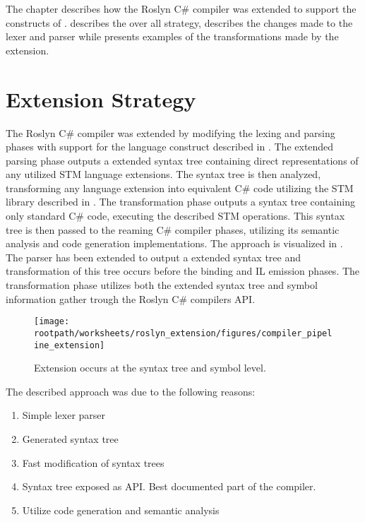 \makeatletter {}\makeatother
{}
The chapter describes how the Roslyn C\# compiler was extended to support the constructs of \stmname.  describes the over all strategy,  describes the changes made to the lexer and parser while  presents examples of the transformations made by the extension.
\label{chap:roslyn_extension}
\section{Extension Strategy}
\label{sec:roslyn_extension_strategy}
The Roslyn C\# compiler was extended by modifying the lexing and parsing phases with support for the language construct described in . The extended parsing phase outputs a extended syntax tree containing direct representations of any utilized \ac{STM} language extensions. The syntax tree is then analyzed, transforming any language extension into equivalent C\# code utilizing the \ac{STM} library described in . The transformation phase outputs a syntax tree containing only standard C\# code, executing the described \ac{STM} operations. This syntax tree is then passed to the reaming C\# compiler phases, utilizing its semantic analysis and code generation implementations. The approach is visualized in . The parser has been extended to output a extended syntax tree and transformation of this tree occurs before the binding and IL emission phases. The transformation phase utilizes both the extended syntax tree and symbol information gather trough the Roslyn C\# compilers \ac{API}.
\begin{figure}[htbp]
\centering
 \texttt{[image: \\rootpath/worksheets/roslyn\_extension/figures/compiler\_pipeline\_extension]} 
 \caption{Extension occurs at the syntax tree and symbol level.}
\label{fig:compiler_pipeline_extension}
\end{figure}

The described approach was due to the following reasons:
\begin{enumerate}
\item Simple lexer parser
\item Generated syntax tree
\item Fast modification of syntax trees
\item Syntax tree exposed as API. Best documented part of the compiler.
\item Utilize code generation and semantic analysis
\end{enumerate}

